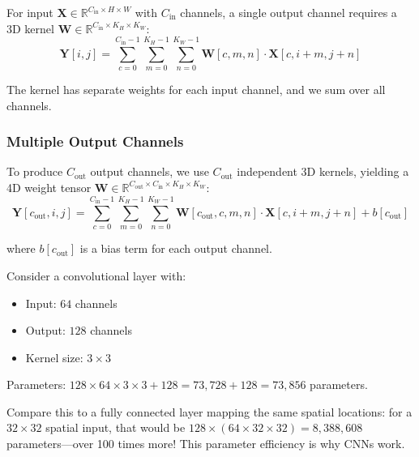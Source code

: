 For input $\mathbf{X} \in \mathbb{R}^{C_{\text{in}} \times H \times W}$ with $C_{\text{in}}$ channels, a single output channel requires a 3D kernel $\mathbf{W} \in \mathbb{R}^{C_{\text{in}} \times K_H \times K_W}$:
\begin{equation}
\mathbf{Y}[i, j] = \sum_{c=0}^{C_{\text{in}}-1} \sum_{m=0}^{K_H-1} \sum_{n=0}^{K_W-1} \mathbf{W}[c, m, n] \cdot \mathbf{X}[c, i + m, j + n]
\label{eq:conv_multichannel_in}
\end{equation}

The kernel has separate weights for each input channel, and we sum over all channels.

\subsubsection{Multiple Output Channels}

To produce $C_{\text{out}}$ output channels, we use $C_{\text{out}}$ independent 3D kernels, yielding a 4D weight tensor $\mathbf{W} \in \mathbb{R}^{C_{\text{out}} \times C_{\text{in}} \times K_H \times K_W}$:
\begin{equation}
\mathbf{Y}[c_{\text{out}}, i, j] = \sum_{c=0}^{C_{\text{in}}-1} \sum_{m=0}^{K_H-1} \sum_{n=0}^{K_W-1} \mathbf{W}[c_{\text{out}}, c, m, n] \cdot \mathbf{X}[c, i + m, j + n] + b[c_{\text{out}}]
\label{eq:conv_full}
\end{equation}

where $b[c_{\text{out}}]$ is a bias term for each output channel.


\begin{example}
Consider a convolutional layer with:
\begin{itemize}
    \item Input: $64$ channels
    \item Output: $128$ channels
    \item Kernel size: $3 \times 3$
\end{itemize}

Parameters: $128 \times 64 \times 3 \times 3 + 128 = 73,728 + 128 = 73,856$ parameters.

Compare this to a fully connected layer mapping the same spatial locations: for a $32 \times 32$ spatial input, that would be $128 \times (64 \times 32 \times 32) = 8,388,608$ parameters---over 100 times more! This parameter efficiency is why CNNs work.
\end{example}

